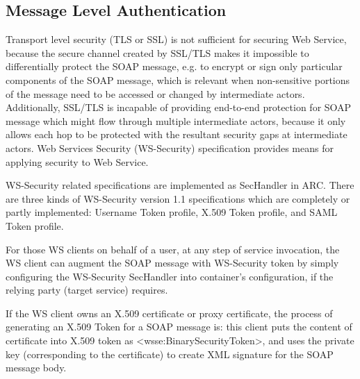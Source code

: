\subsection{Message Level Authentication}
\label{sec:msgauthn}
Transport level security (TLS or SSL) is not sufficient for securing Web Service, because the secure channel created by SSL/TLS makes it impossible to differentially protect the SOAP message, e.g. to encrypt or sign only particular components of the SOAP message, which is relevant when non-sensitive portions of the message need to be accessed or changed by intermediate actors. Additionally, SSL/TLS is incapable of providing end-to-end protection for SOAP message which might flow through multiple intermediate actors, because it only allows each hop to be protected with the resultant security gaps at intermediate actors. Web Services Security (WS-Security)\cite{WSSeclink} specification provides means for applying security to Web Service.

WS-Security related specifications are implemented as SecHandler in ARC. There are three kinds of WS-Security version 1.1 specifications which are completely or partly implemented: Username Token profile, X.509 Token profile, and SAML Token profile.

For those WS clients on behalf of a user, at any step of service invocation, the WS client can augment the SOAP message with WS-Security token by simply configuring the WS-Security SecHandler into container’s configuration, if the relying party (target service) requires.

If the WS client owns an X.509 certificate or proxy certificate, the process of generating an X.509 Token for a SOAP message is: this client puts the content of certificate into X.509 token as <wsse:BinarySecurityToken>, and uses the private key (corresponding to the certificate) to create XML signature for the SOAP message body.

